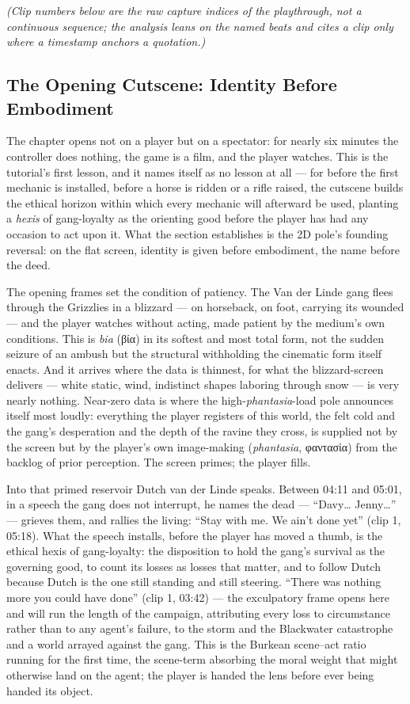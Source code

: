 \documentclass{article}
\newcommand{\gk}[1]{{\greekfont #1}}
\begin{document}
\textit{(Clip numbers below are the raw capture indices of the playthrough, not a continuous sequence; the analysis leans on the named beats and cites a clip only where a timestamp anchors a quotation.)}

\bigskip

\subsection*{The Opening Cutscene: Identity Before Embodiment}

The chapter opens not on a player but on a spectator: for nearly six minutes the controller does nothing, the game is a film, and the player watches. This is the tutorial's first lesson, and it names itself as no lesson at all — for before the first mechanic is installed, before a horse is ridden or a rifle raised, the cutscene builds the ethical horizon within which every mechanic will afterward be used, planting a \textit{hexis} of gang-loyalty as the orienting good before the player has had any occasion to act upon it. What the section establishes is the 2D pole's founding reversal: on the flat screen, identity is given before embodiment, the name before the deed.

The opening frames set the condition of patiency. The Van der Linde gang flees through the Grizzlies in a blizzard — on horseback, on foot, carrying its wounded — and the player watches without acting, made patient by the medium's own conditions. This is \textit{bia} (\gk{βία}) in its softest and most total form, not the sudden seizure of an ambush but the structural withholding the cinematic form itself enacts. And it arrives where the data is thinnest, for what the blizzard-screen delivers — white static, wind, indistinct shapes laboring through snow — is very nearly nothing. Near-zero data is where the high-\textit{phantasia}-load pole announces itself most loudly: everything the player registers of this world, the felt cold and the gang's desperation and the depth of the ravine they cross, is supplied not by the screen but by the player's own image-making (\textit{phantasia}, \gk{φαντασία}) from the backlog of prior perception. The screen primes; the player fills.

Into that primed reservoir Dutch van der Linde speaks. Between 04:11 and 05:01, in a speech the gang does not interrupt, he names the dead — ``Davy… Jenny…'' — grieves them, and rallies the living: ``Stay with me. We ain't done yet'' (clip 1, 05:18). What the speech installs, before the player has moved a thumb, is the ethical hexis of gang-loyalty: the disposition to hold the gang's survival as the governing good, to count its losses as losses that matter, and to follow Dutch because Dutch is the one still standing and still steering. ``There was nothing more you could have done'' (clip 1, 03:42) — the exculpatory frame opens here and will run the length of the campaign, attributing every loss to circumstance rather than to any agent's failure, to the storm and the Blackwater catastrophe and a world arrayed against the gang. This is the Burkean scene–act ratio running for the first time, the scene-term absorbing the moral weight that might otherwise land on the agent; the player is handed the lens before ever being handed its object.
\end{document}
